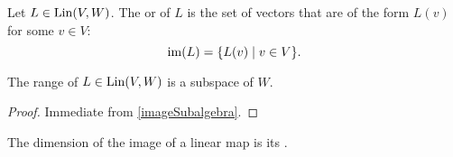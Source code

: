 \begin{definition}
Let $L \in \operatorname{Lin}(V,W)$. The  or  of $L$ is the set of vectors that are of the form $L(v)$ for some $v\in V$:
\[ \im(L) = \setbuilder{L(v)}{v\in V}. \]
\end{definition}

\begin{lemma} \label{rangeSubspace}
The range of $L\in \operatorname{Lin}(V,W)$ is a subspace of $W$.
\end{lemma}
\begin{proof}
Immediate from \ref{imageSubalgebra}.
\end{proof}
\begin{definition}
The dimension of the image of a linear map is its .
\end{definition}


